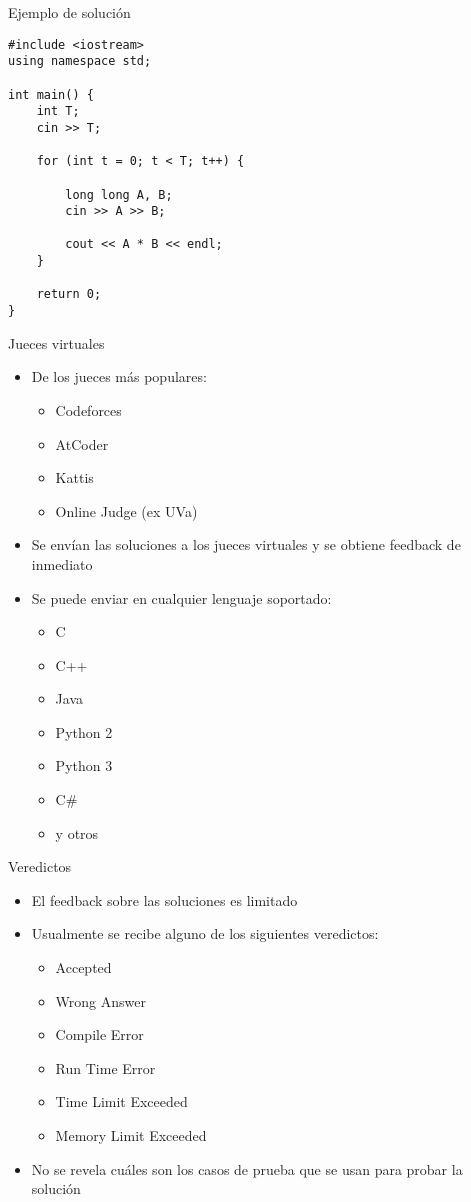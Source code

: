 \documentclass[10pt]{beamer}
\newcommand{\bi}{\begin{itemize}}
\newcommand{\ei}{\end{itemize}}
\begin{document}
\begin{frame}[fragile]{Ejemplo de solución}
    \begin{verbatim}
#include <iostream>
using namespace std;

int main() {
    int T;
    cin >> T;

    for (int t = 0; t < T; t++) {

        long long A, B;
        cin >> A >> B;

        cout << A * B << endl;
    }

    return 0;
}
\end{verbatim}

    \bi
    \ei
\end{frame}


\begin{frame}{Jueces virtuales}
    \bi
        \item De los jueces más populares:
        \bi
            \item \alert{Codeforces}
            \item \alert{AtCoder}
            \item \alert{Kattis}
            \item \alert{Online Judge (ex UVa)}
        \ei
        \item Se envían las soluciones a los jueces virtuales y se obtiene feedback de inmediato
        \item Se puede enviar en cualquier lenguaje soportado:
            \bi
                \item C
                \item C++
                \item Java
                \item Python 2
                \item Python 3
                \item C\#{}
                \item y otros
            \ei
    \ei
\end{frame}

\begin{frame}{Veredictos}
    \bi
        \item El feedback sobre las soluciones es limitado
        \item Usualmente se recibe alguno de los siguientes veredictos:
            \bi
                \item Accepted
                \item Wrong Answer
                \item Compile Error
                \item Run Time Error
                \item Time Limit Exceeded
                \item Memory Limit Exceeded
            \ei

        \item No se revela cuáles son los casos de prueba que se usan para probar la solución
    \ei
\end{frame}
\end{document}

